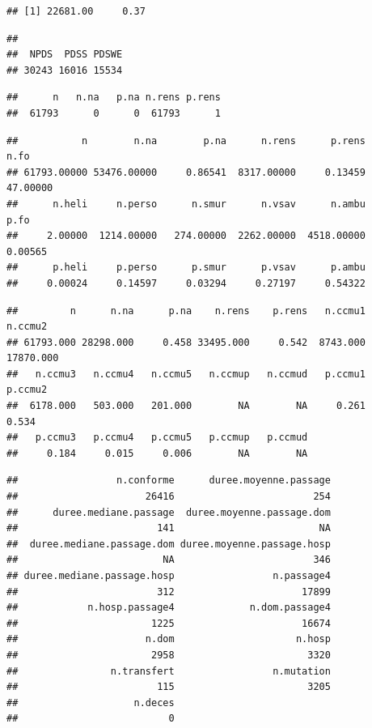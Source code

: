 \documentclass[]{article}
\begin{document}
\begin{verbatim}
## [1] 22681.00     0.37
\end{verbatim}

\begin{verbatim}
## 
##  NPDS  PDSS PDSWE 
## 30243 16016 15534
\end{verbatim}

\begin{verbatim}
##      n   n.na   p.na n.rens p.rens 
##  61793      0      0  61793      1
\end{verbatim}

\begin{verbatim}
##           n        n.na        p.na      n.rens      p.rens        n.fo 
## 61793.00000 53476.00000     0.86541  8317.00000     0.13459    47.00000 
##      n.heli     n.perso      n.smur      n.vsav      n.ambu        p.fo 
##     2.00000  1214.00000   274.00000  2262.00000  4518.00000     0.00565 
##      p.heli     p.perso      p.smur      p.vsav      p.ambu 
##     0.00024     0.14597     0.03294     0.27197     0.54322
\end{verbatim}

\begin{verbatim}
##         n      n.na      p.na    n.rens    p.rens   n.ccmu1   n.ccmu2 
## 61793.000 28298.000     0.458 33495.000     0.542  8743.000 17870.000 
##   n.ccmu3   n.ccmu4   n.ccmu5   n.ccmup   n.ccmud   p.ccmu1   p.ccmu2 
##  6178.000   503.000   201.000        NA        NA     0.261     0.534 
##   p.ccmu3   p.ccmu4   p.ccmu5   p.ccmup   p.ccmud 
##     0.184     0.015     0.006        NA        NA
\end{verbatim}

\begin{verbatim}
##                 n.conforme      duree.moyenne.passage 
##                      26416                        254 
##      duree.mediane.passage  duree.moyenne.passage.dom 
##                        141                         NA 
##  duree.mediane.passage.dom duree.moyenne.passage.hosp 
##                         NA                        346 
## duree.mediane.passage.hosp                 n.passage4 
##                        312                      17899 
##            n.hosp.passage4             n.dom.passage4 
##                       1225                      16674 
##                      n.dom                     n.hosp 
##                       2958                       3320 
##                n.transfert                 n.mutation 
##                        115                       3205 
##                    n.deces 
##                          0
\end{verbatim}
\end{document}
